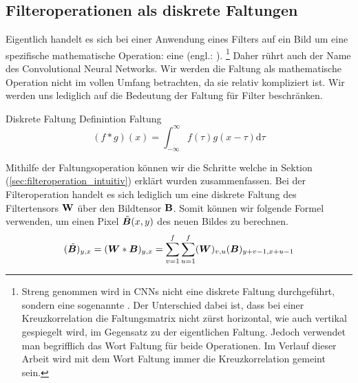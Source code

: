 \subsection{Filteroperationen als diskrete Faltungen}
Eigentlich handelt es sich bei einer Anwendung eines Filters auf ein Bild um
eine spezifische mathematische Operation: eine  (engl.:
).
\footnote{
  Streng genommen wird in CNNs nicht eine diskrete Faltung durchgeführt, sondern
  eine sogenannte . Der Unterschied dabei ist, dass bei einer
  Kreuzkorrelation die Faltungsmatrix nicht zürst horizontal, wie auch vertikal
  gespiegelt wird, im Gegensatz zu der eigentlichen Faltung. Jedoch verwendet man
  begrifflich das Wort Faltung für beide Operationen. Im Verlauf dieser Arbeit
  wird mit dem Wort Faltung immer die Kreuzkorrelation gemeint sein.
}
Daher rührt auch der Name des Convolutional Neural Networks.
Wir werden die Faltung als mathematische Operation nicht im vollen Umfang
betrachten, da sie relativ kompliziert ist. Wir werden uns lediglich auf die
Bedeutung der Faltung für Filter beschränken.
\para{}
\begin{defbox}{Diskrete Faltung}
  Definintion Faltung
  \begin{equation}
    (f * g)(x) = \int_{-\infty}^{\infty} f(\tau) g(x-\tau) \text{d}\tau
  \end{equation}
\end{defbox}
\para{}
Mithilfe der Faltungsoperation können wir die Schritte welche in Sektion
(\ref{sec:filteroperation_intuitiv}) erklärt wurden zusammenfassen.
Bei der Filteroperation handelt es sich lediglich um eine diskrete Faltung des
Filtertensors $\mathbf{W}$ über den Bildtensor $\mathbf{B}$. Somit können wir
folgende Formel verwenden, um einen Pixel $\tilde{\bm{B}}(x,y)$ des neuen Bildes zu berechnen.
\\
\begin{equation}
  (\tilde{\bm{B}})_{y,x} = (\bm{W} * \bm{B})_{y,x} = \sum_{v=1}^{f} \sum_{u=1}^{f} (\bm{W})_{v,u}(\bm{B})_{y+v-1,x+u-1}
\end{equation}
\para{}
